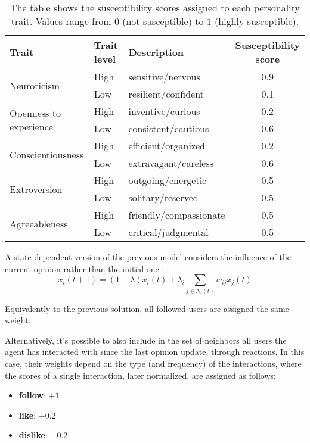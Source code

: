 \begin{table}[h]
\centering
\begin{tabular}{|l|l|l|c|}
\hline
\textbf{Trait} & \textbf{Trait level} & \textbf{Description} & \textbf{Susceptibility score} \\
\hline
\multirow{2}{*}{Neuroticism}       
  & High & sensitive/nervous         & 0.9 \\
  & Low & resilient/confident        & 0.1 \\
\hline
\multirow{2}{*}{Openness to experience}          
  & High & inventive/curious         & 0.2 \\
  & Low & consistent/cautious        & 0.6 \\
\hline
\multirow{2}{*}{Conscientiousness} 
  & High & efficient/organized       & 0.2 \\
  & Low & extravagant/careless       & 0.6 \\
\hline
\multirow{2}{*}{Extroversion}      
  & High & outgoing/energetic        & 0.5 \\
  & Low & solitary/reserved          & 0.5 \\
\hline
\multirow{2}{*}{Agreeableness}     
  & High & friendly/compassionate    & 0.5 \\
  & Low & critical/judgmental        & 0.5 \\
\hline
\end{tabular}
\caption{The table shows the susceptibility scores assigned to each personality trait. Values range from $0$ (not susceptible) to $1$ (highly susceptible).}
\label{tab:susceptibility}
\end{table}

\medskip
A state-dependent version of the previous model considers the influence of the current opinion rather than the initial one \cite{Ye2018Opinion}:
\[
x_i(t + 1) = (1 - \lambda) x_i(t) + \lambda_i  \sum_{j \in N_i(t)} w_{ij} x_j (t)
\]

Equivalently to the previous solution, all followed users are assigned the same weight.

Alternatively, it's possible to also include in the set of neighbors all users the agent has interacted with since the last opinion update, through reactions. In this case, their weights depend on the type (and frequency) of the interactions, where the scores of a single interaction, later normalized, are assigned as follows: 
\begin{itemize}
    \item \textbf{follow}: $+1$
    \item \textbf{like}: $+0.2$
    \item \textbf{dislike}: $-0.2$
\end{itemize}

